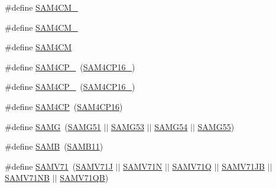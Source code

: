 \begin{DoxyCompactItemize}
\item 
\#define \mbox{\hyperlink{group__sam__part__macros__group_gadbca33c488233ea066312c7c93b62965}{S\+A\+M4\+C\+M\+\_}}
\item 
\#define \mbox{\hyperlink{group__sam__part__macros__group_ga40dfb0460f36223679de0af78510caab}{S\+A\+M4\+C\+M\+\_}}
\item 
\#define \mbox{\hyperlink{group__sam__part__macros__group_ga067569f8932adc3c2b869ead8c68f7de}{S\+A\+M4\+CM}}
\item 
\#define \mbox{\hyperlink{group__sam__part__macros__group_ga01ca8a083b5d4d9ba3c24c9314f69264}{S\+A\+M4\+C\+P\+\_}}~(\mbox{\hyperlink{group__sam__part__macros__group_gaa7359e4b343a4ab48894b656b2f349b9}{S\+A\+M4\+C\+P16\+\_}})
\item 
\#define \mbox{\hyperlink{group__sam__part__macros__group_ga36732239e3e4f8326638b4c159072080}{S\+A\+M4\+C\+P\+\_}}~(\mbox{\hyperlink{group__sam__part__macros__group_ga6757116bcbffd58eca2b98b620175590}{S\+A\+M4\+C\+P16\+\_}})
\item 
\#define \mbox{\hyperlink{group__sam__part__macros__group_ga36c98c0cc8ffa34cff2c10f301c8983d}{S\+A\+M4\+CP}}~(\mbox{\hyperlink{group__sam__part__macros__group_gafd1c94764b607ffb18e6a495e5486659}{S\+A\+M4\+C\+P16}})
\item 
\#define \mbox{\hyperlink{group__sam__part__macros__group_gad4ae7782abc1e1087067d9958af3381c}{S\+A\+MG}}~(\mbox{\hyperlink{group__sam__part__macros__group_gacd7261d3389d2f5c745e64ffe1b89d99}{S\+A\+M\+G51}} $\vert$$\vert$ \mbox{\hyperlink{group__sam__part__macros__group_gaee5167c2eae38c830d175d48769391d8}{S\+A\+M\+G53}} $\vert$$\vert$ \mbox{\hyperlink{group__sam__part__macros__group_ga0cd510d1aac0c983cf19398f7dd2b6a1}{S\+A\+M\+G54}} $\vert$$\vert$ \mbox{\hyperlink{group__sam__part__macros__group_ga80c14f26d62169592dd858e259b440de}{S\+A\+M\+G55}})
\item 
\#define \mbox{\hyperlink{group__sam__part__macros__group_gafee38ed5a47634705a32ff589210928a}{S\+A\+MB}}~(\mbox{\hyperlink{group__sam__part__macros__group_ga2af5455979bc458995adea5aaa7807a2}{S\+A\+M\+B11}})
\item 
\#define \mbox{\hyperlink{group__sam__part__macros__group_ga3244695e750cd101d85bdfbc8802c5e9}{S\+A\+M\+V71}}~(\mbox{\hyperlink{group__sam__part__macros__group_gaec1e3ef31d457e77f20063cdde7e13b9}{S\+A\+M\+V71J}} $\vert$$\vert$ \mbox{\hyperlink{group__sam__part__macros__group_ga8688ea299fbe00f831b4e569cf1c742c}{S\+A\+M\+V71N}} $\vert$$\vert$ \mbox{\hyperlink{group__sam__part__macros__group_ga1abe2ffaaf3eebef08978f55ed456a5c}{S\+A\+M\+V71Q}} $\vert$$\vert$ \mbox{\hyperlink{group__sam__part__macros__group_ga4fbb0bc9ffb5be011f7aa7eeb9e8dd4b}{S\+A\+M\+V71\+JB}} $\vert$$\vert$ \mbox{\hyperlink{group__sam__part__macros__group_gaf052dd0a36916f7370105b557d9c2fa8}{S\+A\+M\+V71\+NB}} $\vert$$\vert$ \mbox{\hyperlink{group__sam__part__macros__group_gaa2f5f7f21d9a40bcd31df4ef38838059}{S\+A\+M\+V71\+QB}})

\end{DoxyCompactItemize}
